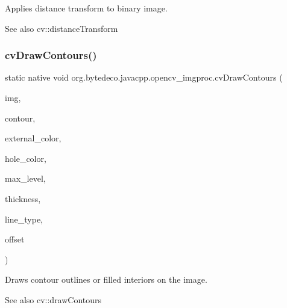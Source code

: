 Applies distance transform to binary image. 

\begin{DoxySeeAlso}{See also}
cv\+::distance\+Transform 
\end{DoxySeeAlso}
\mbox{\label{group__imgproc__c_ga225fad4fc8d41e9c4235b5b6e11de7c9}} 
\subsubsection{\texorpdfstring{cv\+Draw\+Contours()}{cvDrawContours()}}
{\footnotesize\ttfamily static native void org.\+bytedeco.\+javacpp.\+opencv\+\_\+imgproc.\+cv\+Draw\+Contours (\begin{DoxyParamCaption}\item[{Cv\+Arr}]{img,  }\item[{Cv\+Seq}]{contour,  }\item[{@By\+Val Cv\+Scalar}]{external\+\_\+color,  }\item[{@By\+Val Cv\+Scalar}]{hole\+\_\+color,  }\item[{int}]{max\+\_\+level,  }\item[{int}]{thickness,  }\item[{int}]{line\+\_\+type,  }\item[{@By\+Val(null\+Value=\char`\"{}Cv\+fr.antproject.utils.Point(cv\+fr.antproject.utils.Point(0,0))\char`\"{}) Cv\+fr.antproject.utils.Point}]{offset }\end{DoxyParamCaption})\hspace{0.3cm}{\ttfamily [static]}}



Draws contour outlines or filled interiors on the image. 

\begin{DoxySeeAlso}{See also}
cv\+::draw\+Contours 
\end{DoxySeeAlso}
\mbox{\label{group__imgproc__c_gadbdf06d39533d4e9a56ca2a3c6affe2c}} 

